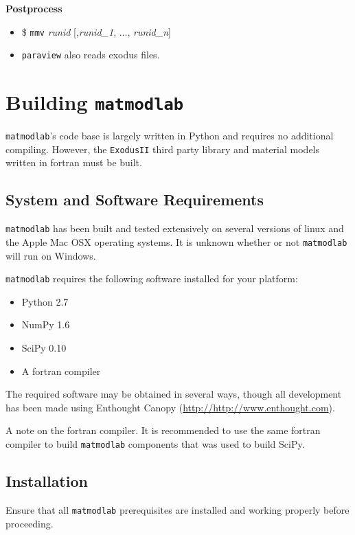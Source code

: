 \documentclass[12pt,report,strict]{SANDreport/SANDreport}
\newcommand{\mml}{\texttt{matmodlab}}
\newcommand{\mmv}{\texttt{mmv}}
\newcommand{\exodusii}{{\sc\texttt{ExodusII}}}
\newcommand{\paraview}[1]{{\sc\texttt{paraview}}}
\begin{document}
\textbf{Postprocess}
\begin{itemize}
  \item \$ \mmv{} \emph{runid} [,\emph{runid\_1}, $\ldots$,
  \emph{runid\_n}]
  \item \paraview{} also reads exodus files.
\end{itemize}


\chapter{Building \mml{}}
\label{chap:build}
\mml{}'s code base is largely written in Python and requires no additional
compiling.  However, the \exodusii{} third party library and material models
written in fortran must be built.

\section{System and Software Requirements}
\label{sec:sys}
\mml{} has been built and tested extensively on several versions of linux and
the Apple Mac OSX operating systems. It is unknown whether or not \mml{}
will run on Windows.

\mml{} requires the following software installed for your platform:

\begin{itemize}
  \item Python 2.7
  \item NumPy 1.6
  \item SciPy 0.10
  \item A fortran compiler
\end{itemize}

The required software may be obtained in several ways, though all development
has been made using Enthought Canopy (\url{http://http://www.enthought.com}).

A note on the fortran compiler.  It is recommended to use the same fortran
compiler to build \mml{} components that was used to build SciPy.

\section{Installation}
\label{sec:install}
Ensure that all \mml{} prerequisites are installed and working properly before
proceeding.
\end{document}
